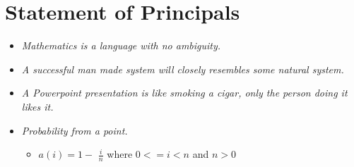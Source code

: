 \documentclass[12pt,twoside]{article}
\begin{document}
\addtolength{\oddsidemargin}{-.5in}
\addtolength{\evensidemargin}{-01.25in}
\addtolength{\textwidth}{1.4in}
\addtolength{\topmargin}{-1.25in}
\addtolength{\textheight}{2.45in}
\setcounter{tocdepth}{3}
\vspace*{2.5cm} 
\noindent{}

\newpage
{}
\setcounter{tocdepth}{2}
\pagestyle{fancy}
\fancyhf[C]{}
\tableofcontents 
\newpage
{}
\section{Statement of Principals}
\label{sec-1}

\begin{itemize}
\item \emph{Mathematics is a language with no ambiguity.}
\item \emph{A successful man made system will closely resembles some natural system.}
\item \emph{A Powerpoint presentation is like smoking a cigar, only the      person doing it likes it.}
\item \emph{Probability from a point.}
\begin{itemize}
\item $a(i) = 1-$ \Large $\frac{i}{n}$ \normalsize where $0 <= i < n$ and $n > 0$
\end{itemize}
\end{itemize}
\end{document}
